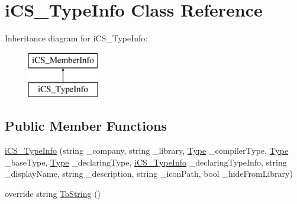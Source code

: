 \hypertarget{classi_c_s___type_info}{\section{i\+C\+S\+\_\+\+Type\+Info Class Reference}
\label{classi_c_s___type_info}
}
Inheritance diagram for i\+C\+S\+\_\+\+Type\+Info\+:\begin{figure}[H]
\begin{center}
\leavevmode
\includegraphics[height=2.000000cm]{classi_c_s___type_info}
\end{center}
\end{figure}
\subsection*{Public Member Functions}
\begin{DoxyCompactItemize}
\item 
\hyperlink{classi_c_s___type_info_a0c9a76b32770423dbf2a698b043c2d4c}{i\+C\+S\+\_\+\+Type\+Info} (string \+\_\+company, string \+\_\+library, \hyperlink{i_c_s___object_type_enum_8cs_ae6c3dd6d8597380b56d94908eb431547aa1fa27779242b4902f7ae3bdd5c6d508}{Type} \+\_\+compiler\+Type, \hyperlink{i_c_s___object_type_enum_8cs_ae6c3dd6d8597380b56d94908eb431547aa1fa27779242b4902f7ae3bdd5c6d508}{Type} \+\_\+base\+Type, \hyperlink{i_c_s___object_type_enum_8cs_ae6c3dd6d8597380b56d94908eb431547aa1fa27779242b4902f7ae3bdd5c6d508}{Type} \+\_\+declaring\+Type, \hyperlink{classi_c_s___type_info}{i\+C\+S\+\_\+\+Type\+Info} \+\_\+declaring\+Type\+Info, string \+\_\+display\+Name, string \+\_\+description, string \+\_\+icon\+Path, bool \+\_\+hide\+From\+Library)
\item 
override string \hyperlink{classi_c_s___type_info_a74f0a1c2d297c86a218fc7ae4968b73e}{To\+String} ()
\end{DoxyCompactItemize}
